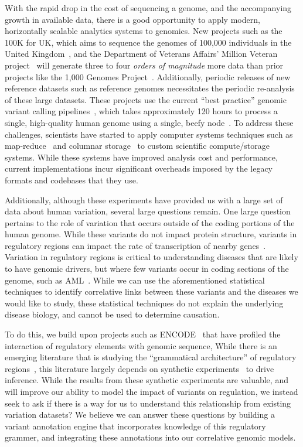 \documentclass[11pt]{article} %
\begin{document}
With the rapid drop in the cost of sequencing a genome, and the accompanying growth in available data,
there is a good opportunity to apply modern, horizontally scalable analytics systems to genomics. New
projects such as the 100K for UK, which aims to sequence the genomes of 100,000 individuals in the
United Kingdom~\cite{uk100k}, and the Department of Veterans Affairs' Million Veteran project~\cite{mvp}
will generate three to four \emph{orders of magnitude} more data than prior projects like the 1,000
Genomes Project~\cite{siva08}. Additionally, periodic releases of new reference datasets such as reference
genomes necessitates the periodic re-analysis of these large datasets. These projects use the current ``best
practice'' genomic variant calling pipelines~\cite{auwera13}, which takes approximately 120 hours to
process a single, high-quality human genome using a single, beefy node~\cite{talwalkar14}. To address
these challenges, scientists have started to apply computer systems techniques such as
map-reduce~\cite{langmead09, mckenna10, schatz09} and columnar storage~\cite{fritz11} to custom
scientific compute/storage systems. While these systems have improved analysis cost and performance,
current implementations incur significant overheads imposed by the legacy formats and codebases that
they use.

Additionally, although these experiments have provided us with a large set of data about
human variation, several large questions remain. One large question pertains to the role of
variation that occurs outside of the coding portions of the human genome. While these variants
do not impact protein structure, variants in regulatory regions can impact the rate of
transcription of nearby genes~\cite{levo14, weingarten14}. Variation in regulatory regions
is critical to understanding diseases that are likely to have genomic drivers, but where few
variants occur in coding sections of the genome, such as AML~\cite{cancer13}. While we can
use the aforementioned statistical techniques to identify correlative links between these variants
and the diseases we would like to study, these statistical techniques do not explain the
underlying disease biology, and cannot be used to determine causation.

To do this, we build upon projects such as ENCODE~\cite{gerstein12} that have profiled the
interaction of regulatory elements with genomic sequence, While there is an emerging literature
that is studying the ``grammatical architecture'' of regulatory regions~\cite{levo14,
weingarten14}, this literature largely depends on synthetic experiments~\cite{sharon12}
to drive inference. While the results from these synthetic experiments are valuable, and
will improve our ability to model the impact of variants on regulation, we instead
seek to ask if there is a way for us to understand this relationship from existing
variation datasets? We believe we can answer these questions by building a variant
annotation engine that incorporates knowledge of this regulatory grammer, and integrating
these annotations into our correlative genomic models.
\end{document}
